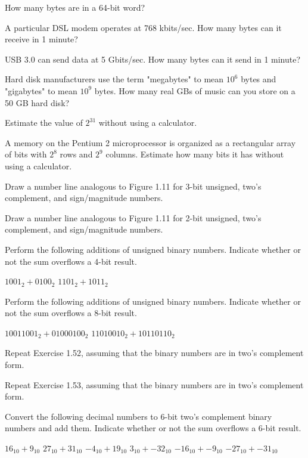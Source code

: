\exercise %
How many bytes are in a 64-bit word?

\exercise %
A particular DSL modem operates at 768 kbits/sec. How many bytes can it receive in 1 minute?

\exercise %
USB 3.0 can send data at 5 Gbits/sec. How many bytes can it send in 1 minute?

\exercise %
Hard disk manufacturers use the term "megabytes" to mean $10^6$ bytes and "gigabytes" to mean
$10^9$ bytes. How many real GBs of music can you store on a 50 GB hard disk?

\exercise %
Estimate the value of $2^31$ without using a calculator.

\exercise %
A memory on the Pentium 2 microprocessor is organized as a rectangular array of bits with $2^8$
rows and $2^9$ columns. Estimate how many bits it has without using a calculator.

\exercise %
Draw a number line analogous to Figure 1.11 for 3-bit unsigned, two's complement,
and sign/magnitude numbers.

\exercise %
Draw a number line analogous to Figure 1.11 for 2-bit unsigned, two's complement,
and sign/magnitude numbers.

\exercise %
Perform the following additions of unsigned binary numbers. Indicate whether or not the sum
overflows a 4-bit result.
\begin{tasks}
	\task $1001_2 + 0100_2$
	\task $1101_2 + 1011_2$
\end{tasks}

\exercise %
Perform the following additions of unsigned binary numbers. Indicate whether or not the sum
overflows a 8-bit result.
\begin{tasks}
	\task $10011001_2 + 01000100_2$
	\task $11010010_2 + 10110110_2$
\end{tasks}

\exercise %
Repeat Exercise 1.52, assuming that the binary numbers are in two's complement form.

\exercise %
Repeat Exercise 1.53, assuming that the binary numbers are in two's complement form.

\exercise %
Convert the following decimal numbers to 6-bit two's complement binary numbers and add them.
Indicate whether or not the sum overflows a 6-bit result.
\begin{tasks}
	\task $16_{10} + 9_{10}$
	\task $27_{10} + 31_{10}$
	\task $-4_{10} + 19_{10}$
	\task $3_{10} + -32_{10}$
	\task $-16_{10} + -9_{10}$
	\task $-27_{10} + -31_{10}$
\end{tasks}

